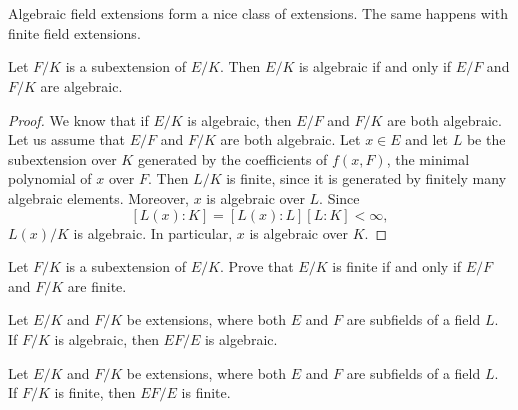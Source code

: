 \chapter{}

%
%
%
Algebraic field extensions form a nice class of extensions. The same happens
with finite field extensions. 

\begin{proposition}
	Let $F/K$ is a subextension of $E/K$. Then $E/K$ is algebraic 
	if and only if $E/F$ and $F/K$ are algebraic. 
\end{proposition}

\begin{proof}
    We know that if $E/K$ is algebraic, then $E/F$ and $F/K$ are both algebraic. 
    Let us assume that $E/F$ and $F/K$ are both algebraic. Let $x\in E$ and 
    let $L$ be the subextension over $K$ generated by the coefficients of $f(x,F)$, 
    the minimal polynomial of $x$ over $F$. Then $L/K$ is finite, since it is generated
    by finitely many algebraic elements. Moreover, $x$ is algebraic over $L$. Since 
    \[
    [L(x):K]=[L(x):L][L:K]<\infty,
    \]
    $L(x)/K$ is algebraic. In particular, $x$ is algebraic over $K$. 
\end{proof}

\begin{exercise}
	Let $F/K$ is a subextension of $E/K$. Prove that $E/K$ is finite 
	if and only if $E/F$ and $F/K$ are finite. 
\end{exercise}

\begin{exercise}
	Let $E/K$ and $F/K$ be extensions, where both $E$ and $F$ are subfields of 
	a field $L$. If $F/K$ is algebraic, then $EF/E$ is algebraic.
\end{exercise}


\begin{exercise}
	Let $E/K$ and $F/K$ be extensions, where both $E$ and $F$ are subfields of 
	a field $L$. If $F/K$ is finite, then $EF/E$ is finite.
\end{exercise}

